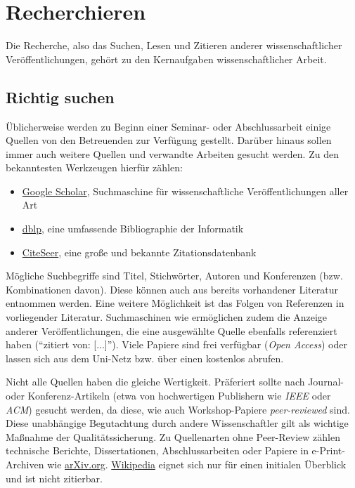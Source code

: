 \section{Recherchieren}%
\label{sec:Recherchieren}

Die Recherche, also das Suchen, Lesen und Zitieren anderer wissenschaftlicher Veröffentlichungen, gehört zu den Kernaufgaben wissenschaftlicher Arbeit.

\subsection{Richtig suchen}%
\label{sec:Recherchieren:Suchen}

Üblicherweise werden zu Beginn einer Seminar- oder Abschlussarbeit einige Quellen von den Betreuenden zur Verfügung gestellt.
Darüber hinaus sollen immer auch weitere Quellen und verwandte Arbeiten gesucht werden.
Zu den bekanntesten Werkzeugen hierfür zählen:

\smallskip
\begin{itemize}[label={\symbolTool}]
    \item \href{https://scholar.google.com/}{Google Scholar}, Suchmaschine für wissenschaftliche Veröffentlichungen aller Art
    \item \href{https://dblp.org/}{dblp}, eine umfassende Bibliographie der Informatik
    \item \href{https://citeseerx.ist.psu.edu/}{CiteSeer}, eine große und bekannte Zitationsdatenbank
\end{itemize}
\smallskip

\noindent
Mögliche Suchbegriffe sind Titel, Stichwörter, Autoren und Konferenzen (bzw. Kombinationen davon).
Diese können auch aus bereits vorhandener Literatur entnommen werden.
Eine weitere Möglichkeit ist das Folgen von Referenzen in vorliegender Literatur.
Suchmaschinen wie  ermöglichen zudem die Anzeige anderer Veröffentlichungen, die eine ausgewählte Quelle ebenfalls referenziert haben (\enquote{zitiert von: [...]}).
Viele Papiere sind frei verfügbar (\emph{Open Access}) oder lassen sich aus dem Uni-Netz bzw. über einen  kostenlos abrufen.

Nicht alle Quellen haben die gleiche Wertigkeit. 
Präferiert sollte nach Journal- oder Konferenz-Artikeln (etwa von hochwertigen Publishern wie \emph{IEEE} oder \emph{ACM}) gesucht werden, da diese, wie auch Workshop-Papiere \emph{peer-reviewed} sind. 
Diese unabhängige Begutachtung durch andere Wissenschaftler gilt als wichtige Maßnahme der Qualitätssicherung. 
Zu Quellenarten ohne Peer-Review zählen technische Berichte, Dissertationen, Abschlussarbeiten oder Papiere in e-Print-Archiven wie \href{https://arXiv.org}{arXiv.org}.  
\href{https://www.wikipedia.org/}{Wikipedia} eignet sich nur für einen initialen Überblick und ist nicht zitierbar.

